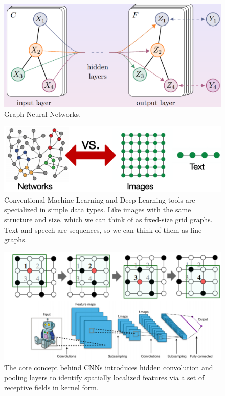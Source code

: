 \begin{figure}
    \centering
    \includegraphics[width=\textwidth]{images/graphNeuralNetworl.png}
    \caption{Graph Neural Networks.}
    \label{fig:graph_neural_networks}
\end{figure}

\begin{figure}
    \centering
    \includegraphics[width=\textwidth]{images/networksVsImages.png}
    \caption{Conventional Machine Learning and Deep Learning tools are specialized in simple data types. Like images with the same structure and size, which we can think of as fixed-size grid graphs. Text and speech are sequences, so we can think of them as line graphs.}
    \label{fig:networksVsImages}
\end{figure}

\begin{figure}
    \centering
    \includegraphics[width=\textwidth]{images/cnnOnAnImage.png}
    \caption{The core concept behind CNNs introduces hidden convolution and pooling layers to identify spatially localized features via a set of receptive fields in kernel form.}
    \label{fig:cnnOnAnImage}
\end{figure}

